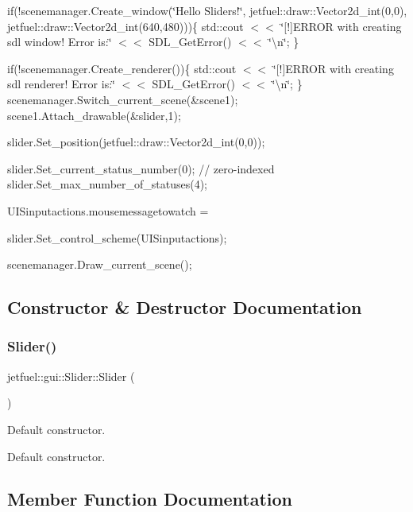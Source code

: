 if(!scenemanager.Create\+\_\+window(\char`\"{}\+Hello Sliders!\char`\"{}, jetfuel\+::draw\+::\+Vector2d\+\_\+int(0,0), jetfuel\+::draw\+::\+Vector2d\+\_\+int(640,480)))\{ std\+::cout $<$$<$ \char`\"{}\mbox{[}!\mbox{]}\+E\+R\+R\+O\+R with creating sdl window! Error is\+:\char`\"{} $<$$<$ S\+D\+L\+\_\+\+Get\+Error() $<$$<$ \char`\"{}\textbackslash{}n\char`\"{}; \}

if(!scenemanager.Create\+\_\+renderer())\{ std\+::cout $<$$<$ \char`\"{}\mbox{[}!\mbox{]}\+E\+R\+R\+O\+R with creating sdl renderer! Error is\+:\char`\"{} $<$$<$ S\+D\+L\+\_\+\+Get\+Error() $<$$<$ \char`\"{}\textbackslash{}n\char`\"{}; \} scenemanager.\+Switch\+\_\+current\+\_\+scene(\&scene1); scene1.\+Attach\+\_\+drawable(\&slider,1);

slider.\+Set\+\_\+position(jetfuel\+::draw\+::\+Vector2d\+\_\+int(0,0));

slider.\+Set\+\_\+current\+\_\+status\+\_\+number(0); // zero-\/indexed slider.\+Set\+\_\+max\+\_\+number\+\_\+of\+\_\+statuses(4);

U\+I\+Sinputactions.\+mousemessagetowatch = 

slider.\+Set\+\_\+control\+\_\+scheme(\+U\+I\+Sinputactions);

scenemanager.\+Draw\+\_\+current\+\_\+scene(); 

\subsection{Constructor \& Destructor Documentation}
\mbox{\label{classjetfuel_1_1gui_1_1Slider_a961a11496cee6ab2f38aef1e14e94922}} 
\subsubsection{\texorpdfstring{Slider()}{Slider()}}
{\footnotesize\ttfamily jetfuel\+::gui\+::\+Slider\+::\+Slider (\begin{DoxyParamCaption}{ }\end{DoxyParamCaption})\hspace{0.3cm}{\ttfamily [inline]}}



Default constructor. 

Default constructor. 

\subsection{Member Function Documentation}
\mbox{\label{classjetfuel_1_1gui_1_1Slider_af9ceba04fec0f7cdc097ea0513094176}} 

